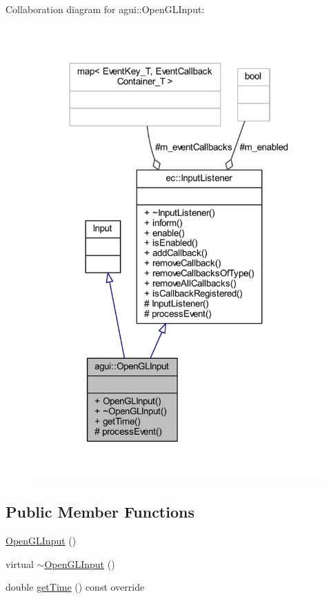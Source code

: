 Collaboration diagram for agui\+:\+:Open\+G\+L\+Input\+:\nopagebreak
\begin{figure}[H]
\begin{center}
\leavevmode
\includegraphics[width=318pt]{classagui_1_1_open_g_l_input__coll__graph}
\end{center}
\end{figure}
\subsection*{Public Member Functions}
\begin{DoxyCompactItemize}
\item 
\mbox{\hyperlink{classagui_1_1_open_g_l_input_a39952038c9c55dd0096959aabdd1bcdd}{Open\+G\+L\+Input}} ()
\item 
virtual \mbox{\hyperlink{classagui_1_1_open_g_l_input_aea9e1ebeaad32419ad923654f96cc325}{$\sim$\+Open\+G\+L\+Input}} ()
\item 
double \mbox{\hyperlink{classagui_1_1_open_g_l_input_afff68e181f8d772a642ecb8de48833db}{get\+Time}} () const override
\end{DoxyCompactItemize}
